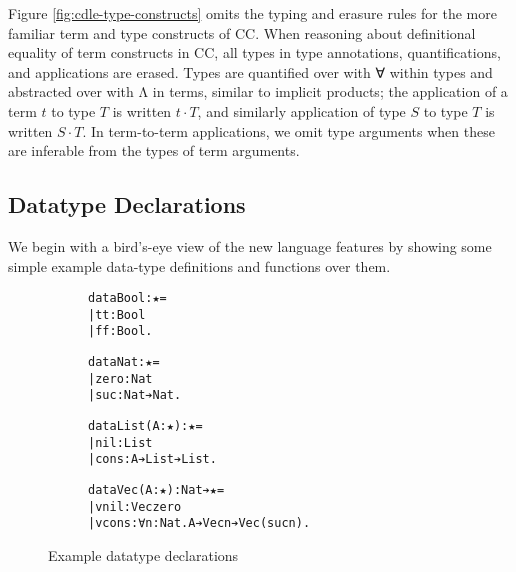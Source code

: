 \documentclass{article}
\begin{document}
Figure \ref{fig:cdle-type-constructs} omits the typing and erasure rules for the
more familiar term and type constructs of CC. When reasoning about definitional
equality of term constructs in CC, all types in type annotations,
quantifications, and applications are erased. Types are quantified over with ∀
within types and abstracted over with Λ in terms, similar to implicit products;
the application of a term $t$ to type $T$ is written $t ·T$, and similarly
application of type $S$ to type $T$ is written $S ·T$. In term-to-term
applications, we omit type arguments when these are inferable from the types of
term arguments.


\subsection{Datatype Declarations}
We begin with a bird's-eye view of the new language features by showing some simple example
data-type definitions and functions over them.

\label{ssec:cedille-standard}
\begin{figure}[h]
  \begin{subfigure}{0.35\linewidth}
\begin{alltt}
data Bool: ★ =
| tt: Bool
| ff: Bool.

data Nat: ★ =
| zero: Nat
| suc: Nat ➔ Nat.
\end{alltt}
  \end{subfigure}%
  \begin{subfigure}{0.4\linewidth}
\begin{alltt}
data List (A: ★): ★ =
| nil: List
| cons: A ➔ List ➔ List.

data Vec (A: ★): Nat ➔ ★ =
| vnil: Vec zero
| vcons: ∀ n: Nat. A ➔ Vec n ➔ Vec (suc n).
\end{alltt}
  \end{subfigure}
  \caption{Example datatype declarations}
  \label{fig:cedille-data-standard}
\end{figure}%
\end{document}
